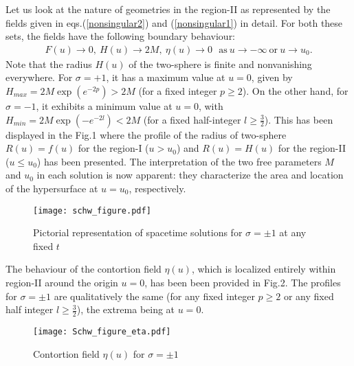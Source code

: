 \documentclass[preprint,aps,superscriptaddress,nofootinbib]{revtex4-1}
\begin{document}
Let us look at the nature of  geometries in the  region-II as represented
by  the fields given in eqs.(\ref{nonsingular2}) and (\ref{nonsingular1}) 
in detail.  For both these sets, the fields have the following boundary 
behaviour:
\begin{eqnarray}
F(u)\rightarrow 0 , ~H(u)\rightarrow 2M,~\eta(u)\rightarrow 0 
~\mathrm{~~as} ~u\rightarrow -\infty~\mathrm{or ~}u\rightarrow u_0.
\end{eqnarray} 
Note that the radius  $H(u)$ of the two-sphere is finite and nonvanishing 
everywhere. For $\sigma=+1$, it has a  maximum value at $u=0$, given by 
$H_{max}=2M \exp(e^{-2p})>2M$ (for a fixed integer $p\geq 2$). On the 
other hand, for $\sigma=-1$, it exhibits a  minimum value at $u=0$, 
with $H_{min}=2M \exp(-e^{-2l})<2M$ (for a fixed half-integer 
$l\geq \frac{3}{2}$). This has been displayed in the Fig.1 where 
the profile of the radius of two-sphere $R(u) = f(u)$ for 
the region-I ($u > u_0$) and $R(u) = H(u)$ for the region-II ($u\le u_0$) 
has been presented. The interpretation of the two free parameters $M$ 
and $u_0$ in each solution is now apparent: they characterize the  area and location of the hypersurface at $u=u_0$, respectively.
\begin{figure}\begin{center}
\texttt{[image: schw\_figure.pdf]}
\caption{Pictorial representation of spacetime solutions for 
$\sigma=\pm 1$ at any fixed $t$}
\end{center}
\end{figure}
 The behaviour of the contortion field $\eta(u)$, which is localized entirely within region-II around the origin $u=0$, has been been provided in Fig.2. The profiles for $\sigma=\pm 1$ are qualitatively the same (for any fixed integer $p\geq 2$ or any fixed half integer $l\geq \frac{3}{2}$), the extrema being at $u=0$.
\begin{figure}\begin{center}
\texttt{[image: Schw\_figure\_eta.pdf]}
\caption{Contortion field $\eta(u)$ for $\sigma=\pm 1$}
\end{center}
\end{figure} 
 
\end{document}
